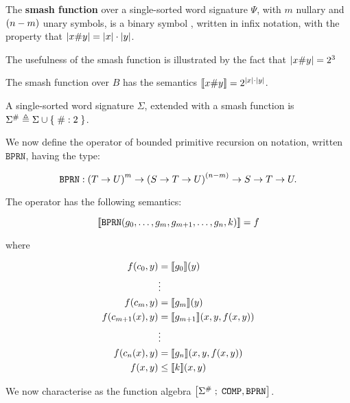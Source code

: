 
\begin{definition} The \textbf{smash function} over a single-sorted word
signature $\Psi$, with $m$ nullary and $\p{n-m}$ unary symbols, is a binary
symbol \smashf{}, written in infix notation, with the property that $\card{x
\smashf{} y} = {\card{x}\cdot\card{y}}$.\end{definition}

The usefulness of the smash function is illustrated by the fact that $\card{x
\smashf{} y} = 2^3$

\begin{example} The smash function over $B$ has the semantics $\sem{x \smashf{}
y} = 2^{\card{x} \cdot \card{y}}$. \end{example}

\begin{definition} A single-sorted word signature $\Sigma$, extended with a
smash function is $\Sigma^\smashf{} \triangleq \Sigma \cup \set { \smashf{} : 2
}$. \end{definition}

We now define the operator of bounded primitive recursion on notation, written
$\mathtt{BPRN}$, having the type:

$$\mathtt{BPRN} : \p{T \rightarrow U}^m \rightarrow \p{S \rightarrow T
\rightarrow U}^\p{n-m} \rightarrow S \rightarrow T \rightarrow U.$$

The operator has the following semantics:

$$\sem{\mathtt{BPRN}\p{g_0, \ldots, g_m, g_{m+1}, \ldots, g_n, k}} = f$$

where

\begin{align*}
f\p{c_0,y} &= \sem{g_0}\p{y} \\
          & \vdots \\
f\p{c_m,y} &= \sem{g_m}\p{y} \\
f\p{c_{m+1}\p{x},y} &= \sem{g_{m+1}}\p{x,y,f\p{x,y}} \\
          & \vdots \\
f\p{c_n\p{x},y} &= \sem{g_n}\p{x,y,f\p{x,y}} \\
f\p{x,y} &\leq \sem{k}\p{x,y}
\end{align*}

We now characterise \FPTIME{} as the function algebra
$\algebra{\Sigma^\smashf{}}{\mathtt{COMP}, \mathtt{BPRN}}$.

